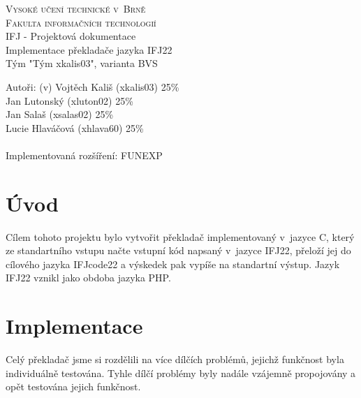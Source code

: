 \documentclass[a4paper, 11pt]{article}
\begin{document}
	\begin{titlepage}
		\begin{center}
			\LARGE\textsc{Vysoké učení technické v~Brně} \\
			\Large\textsc{Fakulta informačních technologií}\\
			\large{IFJ - Projektová dokumentace} \\
			\LARGE{Implementace překladače jazyka IFJ22} \\
			\vspace{0.2cm}
			\large{Tým "Tým xkalis03", varianta BVS}
		\end{center}

		\Large{\hspace*{-0.6cm}Autoři: \hfill (v) \hspace{0.1cm} Vojtěch Kališ (xkalis03)} \hspace{0.97cm} 25\% \\
		\Large{\hspace*{\fill} Jan Lutonský (xluton02)} \hspace{0.82cm} 25\% \\
		\Large{\hspace*{\fill} Jan Salaš (xsalas02)} \hspace{1.73cm} 25\% \\
		\Large{\hspace*{\fill} Lucie Hlaváčová (xhlava60)} \hspace{0.1cm} 25\% \\ \\
		\Large{Implementovaná rozšíření:  \hspace*{1cm} FUNEXP} \hfill
	\end{titlepage}

	\tableofcontents

	\newpage
	\section{Úvod}
	Cílem tohoto projektu bylo vytvořit překladač implementovaný v~jazyce C, který ze standartního vstupu načte vstupní kód napsaný v~jazyce IFJ22, přeloží
	jej do cílového jazyka IFJcode22 a výskedek pak vypíše na standartní výstup. Jazyk IFJ22 vznikl jako obdoba jazyka PHP. 
	\section{Implementace}
	Celý překladač jsme si rozdělili na více dílčích problémů, jejichž funkčnost byla individuálně testována. Tyhle dílčí problémy byly nadále vzájemně 
	propojovány a opět testována jejich funkčnost.
\end{document}
